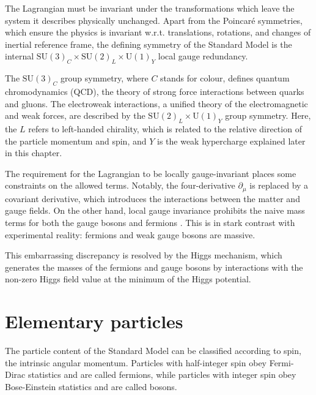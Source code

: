 The Lagrangian must be invariant under the transformations which leave the
system it describes physically unchanged. Apart from the Poincar\'e symmetries, which
ensure the physics is invariant w.r.t. translations, rotations, and changes of inertial
reference frame, the defining symmetry of the Standard Model is the internal
$\text{SU}(3)_C \times \text{SU}(2)_L \times \text{U}(1)_Y$ local gauge redundancy.

The $\text{SU}(3)_C$ group symmetry, where $C$ stands for colour, defines quantum chromodynamics
(QCD), the theory of strong force interactions between quarks and gluons. The electroweak
interactions, a unified theory of the electromagnetic and weak forces, are described by
the $\text{SU}(2)_L \times \text{U}(1)_Y$ group symmetry. Here, the $L$ refers to left-handed
chirality, which is related to the relative direction of the particle momentum and spin, and
$Y$ is the weak hypercharge \cite{Thomson:2013zua} explained later in this chapter.

The requirement for the Lagrangian to be locally gauge-invariant places some constraints
on the allowed terms. Notably, the four-derivative $\partial_\mu$ is replaced by a 
covariant derivative, which introduces the interactions between the matter and gauge
fields. On the other hand, local gauge invariance prohibits the naive mass terms for
both the gauge bosons and fermions \cite{Thomson:2013zua}. This is in stark contrast
with experimental reality: fermions and weak gauge bosons are massive.

This embarrassing discrepancy is resolved by the Higgs mechanism, which generates the
masses of the fermions and gauge bosons by interactions with the non-zero Higgs field
value at the minimum of the Higgs potential.

\section{Elementary particles}

The particle content of the Standard Model can be classified according to spin, the
intrinsic angular momentum. Particles with half-integer spin obey Fermi-Dirac statistics
and are called fermions, while particles with integer spin obey Bose-Einstein
statistics and are called bosons.

